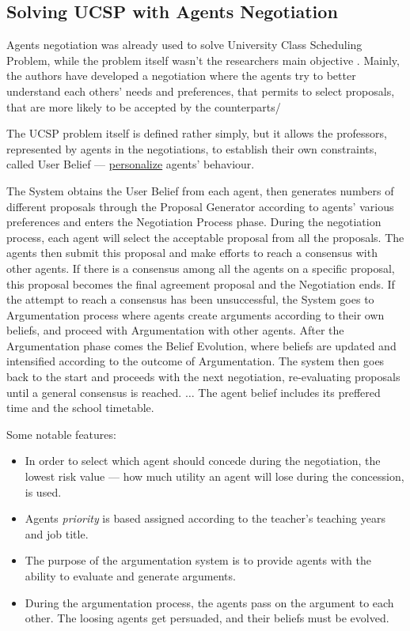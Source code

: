 \documentclass[../header]{subfiles}
\begin{document}
\providecommand{\rootdir}{..}


\subsection{Solving UCSP with Agents Negotiation}
\label{sec:MAS-UCSP}

Agents negotiation was already used to solve University Class Scheduling Problem,
while the problem itself wasn't the researchers main objective \cite{MAS-UCSP}.
Mainly, the authors have developed a negotiation where the agents try to better
understand each others' needs and preferences, that permits to select proposals,
that are more likely to be accepted by the counterparts/

The UCSP problem itself is defined rather simply, but it allows the professors,
represented by agents in the negotiations, to establish their
own constraints, called User Belief --- \underline{personalize} agents' behaviour.

\begin{displayquote}
  The System obtains the User Belief from each agent, then generates
  numbers of different proposals through the Proposal Generator
  according to agents' various preferences and enters the
  Negotiation Process phase. During the negotiation process,
  each agent will select the acceptable proposal from all the
  proposals. The agents then submit this proposal and make
  efforts to reach a consensus with other agents. If there is a
  consensus among all the agents on a specific proposal, this
  proposal becomes the final agreement proposal and the
  Negotiation ends. If the attempt to reach a consensus has been
  unsuccessful, the System goes to Argumentation process where
  agents create arguments according to their own beliefs, and
  proceed with Argumentation with other agents. After the
  Argumentation phase comes the Belief Evolution, where
  beliefs are updated and intensified according to the outcome of
  Argumentation. The system then goes back to the start and
  proceeds with the next negotiation, re-evaluating proposals
  until a general consensus is reached.
  $\dots$ The agent belief includes its preffered time and the school timetable.
  \cite{MAS-UCSP}
\end{displayquote}


\noindent
Some notable features:
\begin{itemize}
  \item In order to select which agent should concede during the negotiation,
    the lowest risk value --- how much utility an agent
    will lose during the concession, is used.
  \item Agents \emph{priority} is based assigned according to the teacher's
    teaching years and job title.
  \item The purpose of the argumentation system is to provide
    agents with the ability to evaluate and generate arguments.
  \item During the argumentation process, the agents pass on the
    argument to each other. The loosing agents  get persuaded,
    and their beliefs must be evolved.
\end{itemize}
\end{document}
